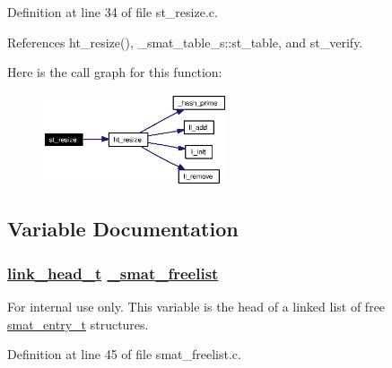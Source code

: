 Definition at line 34 of file st\_\-resize.c.

References ht\_\-resize(), \_\-smat\_\-table\_\-s::st\_\-table, and st\_\-verify.

Here is the call graph for this function:\begin{figure}[H]
\begin{center}
\leavevmode
\includegraphics[width=154pt]{group__dbprim__smat_ga16_cgraph}
\end{center}
\end{figure}


\subsection{Variable Documentation}
\hypertarget{group__dbprim__smat_ga7}{
\subsubsection[\_\-smat\_\-freelist]{\setlength{\rightskip}{0pt plus 5cm}\hyperlink{struct__link__head__s}{link\_\-head\_\-t} \hyperlink{group__dbprim__smat_ga7}{\_\-smat\_\-freelist}}}
\label{group__dbprim__smat_ga7}


\begin{Desc}
\item[For internal use only.]
This variable is the head of a linked list of free \hyperlink{group__dbprim__smat_ga2}{smat\_\-entry\_\-t} structures.\end{Desc}


Definition at line 45 of file smat\_\-freelist.c.